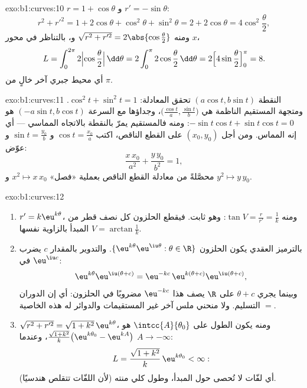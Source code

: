 \begin{solution}{exo:b1:curves:10}
$r = 1 + \cos\theta$ و $r' = -\sin\theta$:
\[
r^2 + r'^2 = 1 + 2\cos\theta + \cos^2\theta + \sin^2\theta
= 2 + 2\cos\theta = 4\cos^2\frac\theta2 ,
\]
ومنه $\sqrt{r^2 + r'^2} = 2\abs{\cos\frac\theta2}$ و، بالتناظر
في محور $x$،
\[
L = \int_0^{2\pi} 2\Bigl|\cos\frac\theta2\Bigr|\,\dd\theta
= 2\int_0^{\pi} 2\cos\frac\theta2\,\dd\theta
= 2\Bigl[4\sin\frac\theta2\Bigr]_0^{\pi} = 8 .
\]
أي محيط جبري آخر خالٍ من $\pi$.
\end{solution}

\begin{solution}{exo:b1:curves:11}
النقطة $(a\cos t, b\sin t)$ تحقق المعادلة:
$\cos^2 t + \sin^2 t = 1$. ومتجهة المستقيم الناظمة هي
$\bigl(\frac{\cos t}a, \frac{\sin t}b\bigr)$، وجداؤها
مع السرعة $(-a\sin t, b\cos t)$ هو $-\sin t\cos t +
\sin t\cos t = 0$: ومنه فالمستقيم يمرّ بالنقطة بالاتجاه
المماسي --- أي إنه المماس. ومن أجل $(x_0, y_0)$ على
القطع الناقص، اكتب $\cos t = \frac{x_0}a$ و $\sin t = \frac{y_0}b$ و
عوّض:
\[
\frac{x\,x_0}{a^2} + \frac{y\,y_0}{b^2} = 1 ,
\]
محصَّلةً من معادلة القطع الناقص بعملية «فصل» $x^2 \mapsto
x\,x_0$ و $y^2 \mapsto y\,y_0$.
\end{solution}

\begin{solution}{exo:b1:curves:12}
\begin{enumerate}
  \item $r' = k\eu^{k\theta}$، ومنه $\tan V = \frac{r}{r'} =
        \frac1k$: وهو ثابت. فيقطع الحلزون كل نصف قطر من
        المبدأ بالزاوية نفسها $V = \arctan\frac1k$.
  \item بالترميز العقدي يكون الحلزون $\{\eu^{k\theta}
        \eu^{\iu\theta} : \theta \in \R\}$. والتدوير بالمقدار $c$
        يضرب في $\eu^{\iu c}$:
        \[
        \eu^{k\theta}\eu^{\iu(\theta + c)}
        = \eu^{-kc}\,\eu^{k(\theta + c)}\eu^{\iu(\theta+c)} ,
        \]
        وبينما يجري $\theta + c$ على $\R$ يصف هذا
        $\eu^{-kc}$ مضروبًا في الحلزون: أي إن الدوران $=$ التسليم. ولا
        منحني ملس آخر غير المستقيمات والدوائر له هذه
        الخاصية.
  \item $\sqrt{r^2 + r'^2} = \sqrt{1 + k^2}\,\eu^{k\theta}$، ومنه
        يكون الطول على $\intcc{A}{\theta_0}$ هو
        $\frac{\sqrt{1+k^2}}{k}\bigl(\eu^{k\theta_0} -
        \eu^{kA}\bigr)$، وعندما $A \to -\infty$:
        \[
        L = \frac{\sqrt{1 + k^2}}{k}\,\eu^{k\theta_0} < \infty :
        \]
        أي لفّات لا تُحصى حول المبدأ، وطول كلي
        منته (لأن اللفّات تتقلص هندسيًا).
\end{enumerate}
\end{solution}

